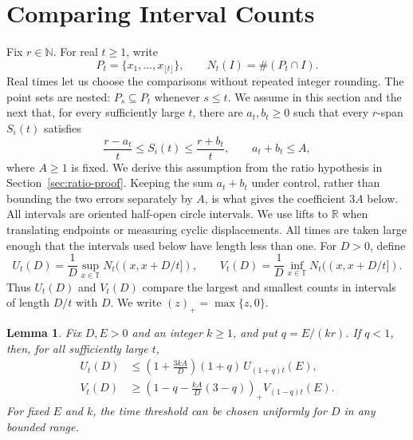 \documentclass[11pt]{article}
\newtheorem{lemma}[theorem]{Lemma}
\theoremstyle{remark}
\numberwithin{equation}{section}
\newcommand{\T}{\mathbb{T}}
\newcommand{\R}{\mathbb{R}}
\newcommand{\N}{\mathbb{N}}
\begin{document}
\section{Comparing Interval Counts}
Fix $r\in\N$. For real $t\geq1$, write
\[
  P_t=\{x_1,\ldots,x_{\lfloor t\rfloor}\},
  \qquad
  N_t(I)=\#(P_t\cap I).
\]
Real times let us choose the comparisons without repeated integer
rounding. The point sets are nested: $P_s\subseteq P_t$ whenever $s\leq t$.
We assume in this section and the next that, for every sufficiently large
$t$, there are $a_t,b_t\geq0$ such that every $r$-span $S_i(t)$ satisfies
\begin{equation}\label{eq:span-assumption}
  \frac{r-a_t}{t}\leq S_i(t)\leq\frac{r+b_t}{t},
  \qquad a_t+b_t\leq A,
\end{equation}
where $A\geq1$ is fixed. We derive this assumption from the ratio hypothesis
in Section~\ref{sec:ratio-proof}. Keeping the sum $a_t+b_t$ under control,
rather than
bounding the two errors separately by $A$, is what gives the coefficient
$3A$ below.
All intervals are oriented half-open circle intervals. We use lifts to
$\R$ when translating endpoints or measuring cyclic displacements. All
times are taken large enough that the intervals used below have length
less than one.
For $D>0$, define
\[
  U_t(D)=\frac1D\sup_{x\in\T}N_t((x,x+D/t]),
  \qquad
  V_t(D)=\frac1D\inf_{x\in\T}N_t((x,x+D/t]).
\]
Thus $U_t(D)$ and $V_t(D)$ compare the largest and smallest counts in
intervals of length $D/t$ with $D$. We write $(z)_+=\max\{z,0\}$.
\begin{lemma}\label{lem:comparison}
Fix $D,E>0$ and an integer $k\geq1$, and put $q=E/(kr)$. If $q<1$, then,
for all sufficiently large $t$,
\begin{align}
  U_t(D)
  &\leq
  \left(1+\frac{3kA}{D}\right)(1+q)\,
  U_{(1+q)t}(E),\label{eq:comparison-upper}\\
  V_t(D)
  &\geq
  \left(1-q-\frac{kA}{D}(3-q)\right)_+
  V_{(1-q)t}(E).\label{eq:comparison-lower}
\end{align}
For fixed $E$ and $k$, the time threshold can be chosen uniformly for $D$
in any bounded range.
\end{lemma}
\end{document}
